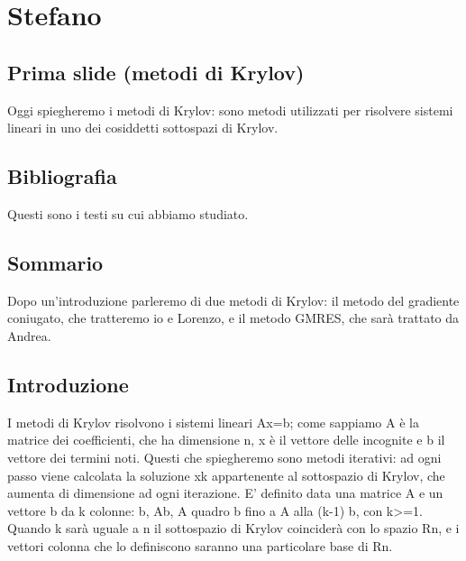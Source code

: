 \documentclass[a4paper]{article}
\begin{document}
\maketitle

\section*{Stefano}
\subsection*{Prima slide (metodi di Krylov)}
Oggi spiegheremo i metodi di Krylov: sono metodi utilizzati per risolvere sistemi lineari in uno dei cosiddetti sottospazi di Krylov.

\subsection*{Bibliografia}
Questi sono i testi su cui abbiamo studiato.

\subsection*{Sommario}
Dopo un’introduzione parleremo di due metodi di Krylov: il metodo del gradiente coniugato, che tratteremo io e Lorenzo, e il metodo GMRES, che sarà trattato da Andrea. 

\subsection*{Introduzione}
I metodi di Krylov risolvono i sistemi lineari Ax=b; come sappiamo A è la matrice dei coefficienti, che ha dimensione n, x è il vettore delle incognite e b il vettore dei termini noti. Questi che spiegheremo sono metodi iterativi: ad ogni passo viene calcolata la soluzione xk appartenente al sottospazio di Krylov, che aumenta di dimensione ad ogni iterazione. E' definito data una matrice A e un vettore b da k colonne: b, Ab, A quadro b fino a A alla (k-1) b, con k>=1. Quando k sarà uguale a n il sottospazio di Krylov coinciderà con lo spazio Rn, e i vettori colonna che lo definiscono saranno una particolare base di Rn.
\end{document}
